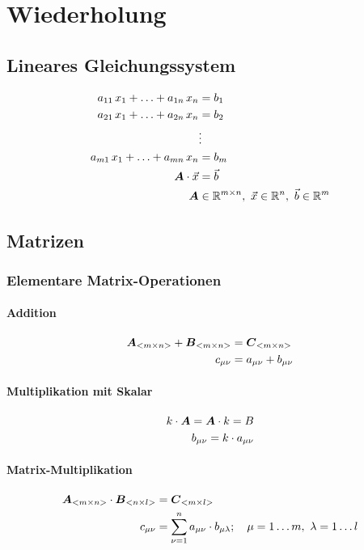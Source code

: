 \section{Wiederholung}

\subsection{Lineares Gleichungssystem}

\begin{align}
	a_{11}\,x_1 + \ldots + a_{1n}\,x_n &= b_1\\
	a_{21}\,x_1 + \ldots + a_{2n}\,x_n &= b_2\\
	&\vdots\\
	a_{m1}\,x_1 + \ldots + a_{mn}\,x_n &= b_m\\
	\ma{A} \cdot \vec{x} &= \vec{b}\\
	\ma{A} &\in \mathbb{R}^{m\times n},\ \vec{x} \in \mathbb{R}^n,\ \vec{b} \in \mathbb{R}^m
\end{align}

\subsection{Matrizen}
\subsubsection{Elementare Matrix-Operationen}

\paragraph{Addition}
\begin{align}
	\boldsymbol {A}_{<m\times n>} + \boldsymbol {B}_{<m\times n>} &= \boldsymbol {C}_{<m\times n>}\\
	c_{\mu\nu} &= a_{\mu\nu} + b_{\mu\nu}
\end{align}

\paragraph{Multiplikation mit Skalar}
\begin{align}
	k \cdot \boldsymbol {A} = \boldsymbol {A} \cdot k = B\\
	b_{\mu\nu} = k \cdot a_{\mu\nu}
\end{align}

\paragraph{Matrix-Multiplikation}
\begin{align}
	\boldsymbol {A}_{<m\times n>} \cdot \boldsymbol {B}_{<n\times l>} &= \boldsymbol {C}_{<m\times l>}\\
	c_{\mu\nu} &= \sum_{\nu=1}^{n} a_{\mu\nu} \cdot b_{\mu\lambda};\quad \mu=1\ldots m,\ \lambda=1\ldots l
\end{align}

